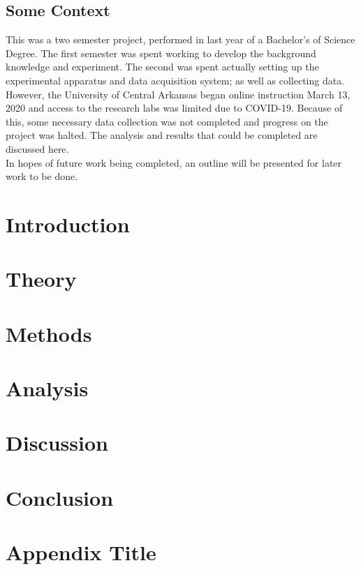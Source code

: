 \documentclass[letterpaper]{report}
\begin{document}


\clearpage
\section{Some Context}
This was a two semester project, performed in last year of a Bachelor's of Science Degree. The first semester was spent working to develop the background knowledge and experiment. The second was spent actually setting up the experimental apparatus and data acquisition system; as well as collecting data. However, the University of Central Arkansas began online instruction March 13, 2020 and access to the research labs was limited due to COVID-19. Because of this, some necessary data collection was not completed and progress on the project was halted. The analysis and results that could be completed are discussed here. \\
In hopes of future work being completed, an outline will be presented for later work to be done.

\tableofcontents
\printnomenclature[0.5in]

\chapter{Introduction}\label{chap:Introduction}


\chapter{Theory}\label{chap:Theory}


\chapter{Methods}\label{chap:Methods}


\chapter{Analysis}\label{chap:Analysis}


\chapter{Discussion}\label{chap:Discussion}


\chapter{Conclusion}\label{chap:Conclusion}





\appendix
\chapter{Appendix Title}\label{chap:Appendix}

\end{document}
